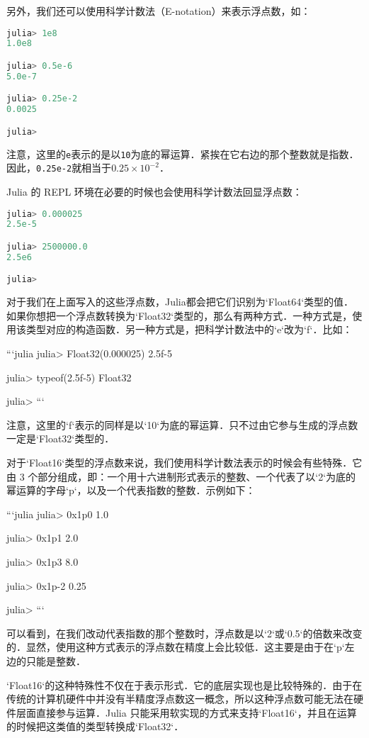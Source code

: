 另外，我们还可以使用科学计数法（E-notation）来表示浮点数，如：
\begin{lstlisting}[language=julia]
julia> 1e8
1.0e8

julia> 0.5e-6
5.0e-7

julia> 0.25e-2
0.0025

julia> 
\end{lstlisting}

注意，这里的\verb|e|表示的是以\verb|10|为底的幂运算．紧挨在它右边的那个整数就是指数．因此，\verb|0.25e-2|就相当于$0.25\times10^{-2}$．

Julia 的 REPL 环境在必要的时候也会使用科学计数法回显浮点数：

\begin{lstlisting}[language=julia]
julia> 0.000025
2.5e-5

julia> 2500000.0
2.5e6

julia> 
\end{lstlisting}

对于我们在上面写入的这些浮点数，Julia都会把它们识别为`Float64`类型的值．如果你想把一个浮点数转换为`Float32`类型的，那么有两种方式．一种方式是，使用该类型对应的构造函数．另一种方式是，把科学计数法中的`e`改为`f`．比如：

```julia
julia> Float32(0.000025)
2.5f-5

julia> typeof(2.5f-5)
Float32

julia> 
```

注意，这里的`f`表示的同样是以`10`为底的幂运算．只不过由它参与生成的浮点数一定是`Float32`类型的．

对于`Float16`类型的浮点数来说，我们使用科学计数法表示的时候会有些特殊．它由 3 个部分组成，即：一个用十六进制形式表示的整数、一个代表了以`2`为底的幂运算的字母`p`，以及一个代表指数的整数．示例如下：

```julia
julia> 0x1p0
1.0

julia> 0x1p1
2.0

julia> 0x1p3
8.0

julia> 0x1p-2
0.25

julia> 
```

可以看到，在我们改动代表指数的那个整数时，浮点数是以`2`或`0.5`的倍数来改变的．显然，使用这种方式表示的浮点数在精度上会比较低．这主要是由于在`p`左边的只能是整数．

`Float16`的这种特殊性不仅在于表示形式．它的底层实现也是比较特殊的．由于在传统的计算机硬件中并没有半精度浮点数这一概念，所以这种浮点数可能无法在硬件层面直接参与运算．Julia 只能采用软实现的方式来支持`Float16`，并且在运算的时候把这类值的类型转换成`Float32`．

